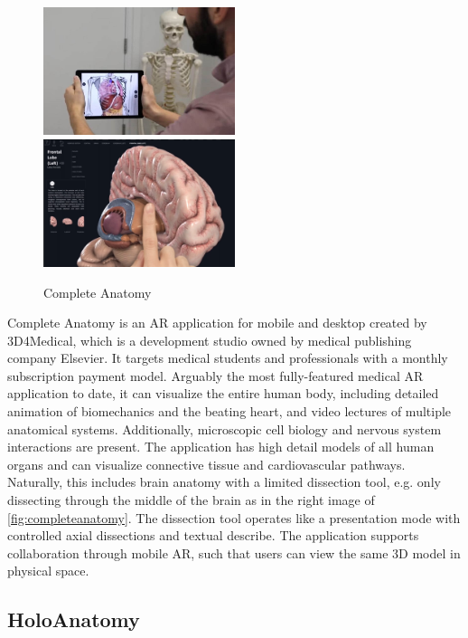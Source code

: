 \begin{figure}[H]
    \includegraphics[width=0.5\textwidth]{fig/completeanatomyipad}
    \includegraphics[width=0.5\textwidth]{fig/completeanatomybrain}
    \caption{Complete Anatomy}
    \label{fig:completeanatomy}
\end{figure}

Complete Anatomy is an AR application for mobile and desktop created by 3D4Medical, which is a development studio owned by medical publishing company Elsevier. It targets medical students and professionals with a monthly subscription payment model. 
Arguably the most fully-featured medical AR application to date, it can visualize the entire human body, including detailed animation of biomechanics and the beating heart, and video lectures of multiple anatomical systems. Additionally, microscopic cell biology and nervous system interactions are present. 
The application has high detail models of all human organs and can visualize connective tissue and cardiovascular pathways.
Naturally, this includes brain anatomy with a limited dissection tool, e.g. only dissecting through the middle of the brain as in the right image of  \autoref{fig:completeanatomy}. The dissection tool operates like a presentation mode with controlled axial dissections and textual describe. 
The application supports collaboration through mobile AR, such that users can view the same 3D model in physical space.  


\subsection*{HoloAnatomy}

